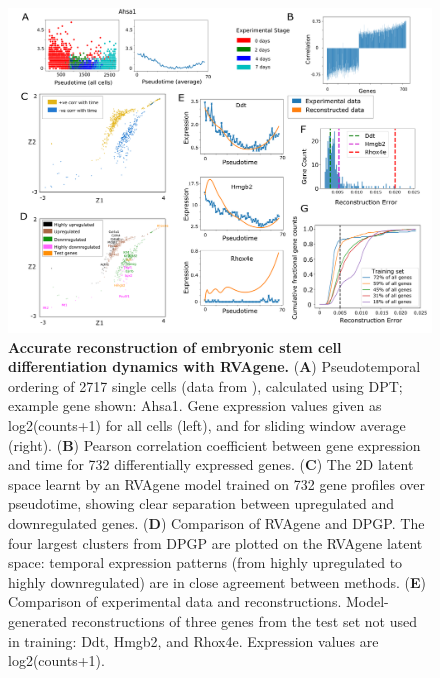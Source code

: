 

{\centering
\begin{figure}%
  \includegraphics[width=\linewidth]{figures/esc_results.png}
    \caption[Accurate reconstruction of embryonic stem cell differentiation dynamics with RVAgene.]{\textbf{Accurate reconstruction of embryonic stem cell differentiation dynamics with RVAgene.}
     ({\bf A}) Pseudotemporal ordering of 2717 single cells (data from \citep{Klein2015}), calculated using DPT; example gene shown: Ahsa1. Gene expression values given as log2(counts+1) for all cells (left), and for sliding window average (right).  ({\bf B}) Pearson correlation coefficient between gene expression and time for 732 differentially expressed genes.
    ({\bf C}) The 2D latent space learnt by an RVAgene model trained on 732 gene profiles over pseudotime, showing clear separation between upregulated and downregulated genes. ({\bf D}) Comparison of RVAgene and DPGP. The four largest clusters from DPGP are plotted on the RVAgene latent space: temporal expression patterns (from highly upregulated to highly downregulated) are in close agreement between methods. ({\bf E}) Comparison of experimental data and reconstructions. Model-generated reconstructions of three genes from the test set not used in training: Ddt, Hmgb2, and Rhox4e. Expression values are log2(counts+1).
}
\end{figure}}
